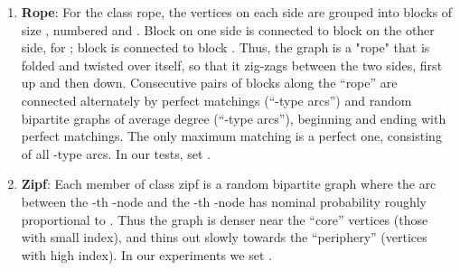 \documentclass{article}
\begin{document}
\begin{enumerate}
\item {\bf Rope}: For the class {\sf rope}, the vertices on each side are grouped into  blocks of size , numbered  and . Block  on one side is connected to block  on the other side, for ; block  is connected to block . Thus, the graph is a "rope" that is folded and twisted over itself, so that it zig-zags between the two sides, first up and then down. Consecutive
pairs of blocks along the ``rope'' are connected alternately by perfect matchings (``-type arcs'') and random bipartite graphs of average degree  (``-type arcs''), beginning and ending with perfect matchings. The only maximum matching is a perfect one, consisting of all -type arcs. In our tests, set .

\item {\bf Zipf}: Each member of class {\sf zipf} is a random bipartite graph where the arc between the -th -node and the -th -node has nominal probability roughly proportional to . Thus the graph is denser near the ``core'' vertices (those with small index), and thins out slowly towards the ``periphery'' (vertices with high index). In our experiments we set .
\end{enumerate}
\end{document}
